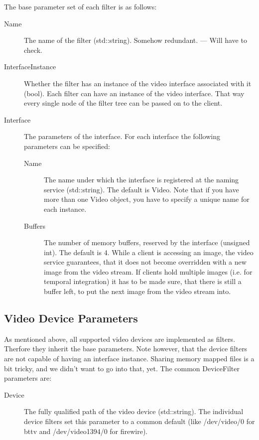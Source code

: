 The base parameter set of each filter is as follows:

\begin{description}
\item[Name] The name of the filter (std::string).
  Somehow redundant. --- Will have to check.
\item[InterfaceInstance] Whether the filter has an instance of the
  video interface associated with it (bool).
  Each filter can have an instance of the video interface. That way
  every single node of the filter tree can be passed on to the client.
\item[Interface] The parameters of the interface. For each interface
  the following parameters can be specified:
  \begin{description}
  \item[Name] The name under which the interface is registered at the
    naming service (std::string). The default is Video. Note that if
    you have more than one Video object, you have to specify a unique
    name for each instance.
  \item[Buffers] The number of memory buffers, reserved by the interface
    (unsigned int). The default is 4. While a client is accessing an
    image, the video service guarantees, that it does not become
    overridden with a new image from the video stream. If clients hold
    multiple images (i.e. for temporal integration) it has to be made
    sure, that there is still a buffer left, to put the next image from
    the video stream into.
  \end{description}
\end{description}

\subsection{Video Device Parameters}

As mentioned above, all supported video devices are implemented as
filters. Therfore they inherit the base parameters. Note however, that
the device filters are not capable of having an interface
instance. Sharing memory mapped files is a bit tricky, and we didn't
want to go into that, yet. The common DeviceFilter parameters are:

\begin{description}
\item[Device] The fully qualified path of the video device
  (std::string). The individual device filters set this parameter to
  a common default (like /dev/video/0 for bttv and /dev/video1394/0 for
  firewire).
\end{description}

